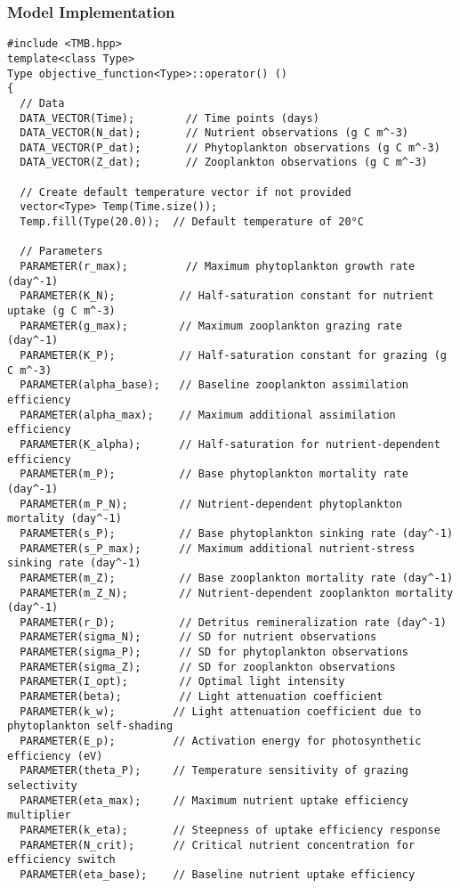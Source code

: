 \subsubsection{Model Implementation}
\begin{lstlisting}
#include <TMB.hpp>
template<class Type>
Type objective_function<Type>::operator() ()
{
  // Data
  DATA_VECTOR(Time);        // Time points (days)
  DATA_VECTOR(N_dat);       // Nutrient observations (g C m^-3)
  DATA_VECTOR(P_dat);       // Phytoplankton observations (g C m^-3)
  DATA_VECTOR(Z_dat);       // Zooplankton observations (g C m^-3)
  
  // Create default temperature vector if not provided
  vector<Type> Temp(Time.size());
  Temp.fill(Type(20.0));  // Default temperature of 20°C
  
  // Parameters
  PARAMETER(r_max);         // Maximum phytoplankton growth rate (day^-1)
  PARAMETER(K_N);          // Half-saturation constant for nutrient uptake (g C m^-3)
  PARAMETER(g_max);        // Maximum zooplankton grazing rate (day^-1)
  PARAMETER(K_P);          // Half-saturation constant for grazing (g C m^-3)
  PARAMETER(alpha_base);   // Baseline zooplankton assimilation efficiency
  PARAMETER(alpha_max);    // Maximum additional assimilation efficiency
  PARAMETER(K_alpha);      // Half-saturation for nutrient-dependent efficiency
  PARAMETER(m_P);          // Base phytoplankton mortality rate (day^-1)
  PARAMETER(m_P_N);        // Nutrient-dependent phytoplankton mortality (day^-1)
  PARAMETER(s_P);          // Base phytoplankton sinking rate (day^-1)
  PARAMETER(s_P_max);      // Maximum additional nutrient-stress sinking rate (day^-1)
  PARAMETER(m_Z);          // Base zooplankton mortality rate (day^-1)
  PARAMETER(m_Z_N);        // Nutrient-dependent zooplankton mortality (day^-1)
  PARAMETER(r_D);          // Detritus remineralization rate (day^-1)
  PARAMETER(sigma_N);      // SD for nutrient observations
  PARAMETER(sigma_P);      // SD for phytoplankton observations
  PARAMETER(sigma_Z);      // SD for zooplankton observations
  PARAMETER(I_opt);        // Optimal light intensity
  PARAMETER(beta);         // Light attenuation coefficient
  PARAMETER(k_w);         // Light attenuation coefficient due to phytoplankton self-shading
  PARAMETER(E_p);         // Activation energy for photosynthetic efficiency (eV)
  PARAMETER(theta_P);     // Temperature sensitivity of grazing selectivity
  PARAMETER(eta_max);     // Maximum nutrient uptake efficiency multiplier
  PARAMETER(k_eta);       // Steepness of uptake efficiency response
  PARAMETER(N_crit);      // Critical nutrient concentration for efficiency switch
  PARAMETER(eta_base);    // Baseline nutrient uptake efficiency
  


\end{lstlisting}
